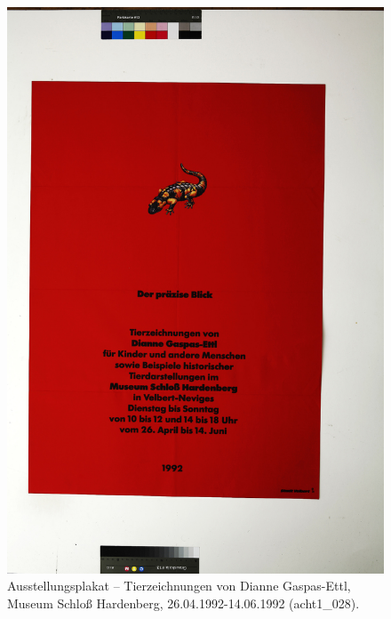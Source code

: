 \documentclass[a4paper,12pt,ngerman]{article}
\begin{document}
\begin{figure}[ht]
\includegraphics[width=\linewidth]{Abbildung_1_(acht1_028)}
\centering
\caption{Ausstellungsplakat -- Tierzeichnungen von Dianne Gaspas-Ettl, Museum Schloß Hardenberg, 26.04.1992-14.06.1992 (acht1\_028).}
\end{figure}
\end{document}

